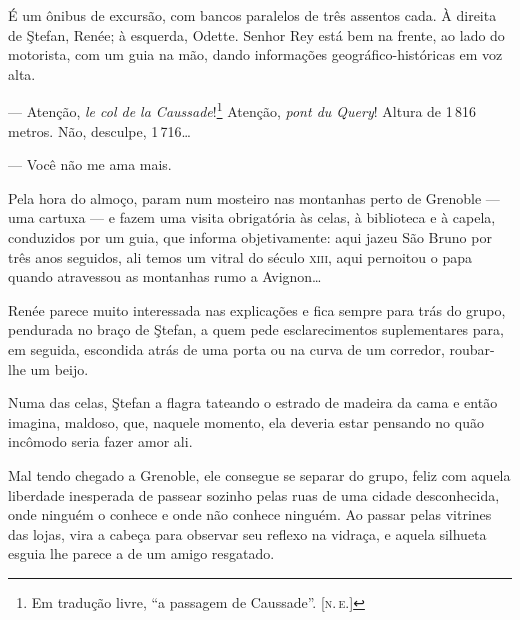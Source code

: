 É um ônibus de excursão, com bancos paralelos de três assentos cada. À
direita de Ştefan, Renée; à esquerda, Odette. Senhor Rey está bem na
frente, ao lado do motorista, com um guia na mão, dando informações
geográfico-históricas em voz alta.

--- Atenção, \emph{le col de la Caussade}!\footnote{Em tradução livre, ``a passagem de Caussade''. \textsc{{[}n.\,e.{]}}} Atenção, \emph{pont du
Query}! Altura de 1\,816 metros. Não, desculpe, 1\,716\ldots{}


--- Você não me ama mais.


Pela hora do almoço, param num mosteiro nas montanhas perto de Grenoble
--- uma cartuxa --- e fazem uma visita obrigatória às celas, à
biblioteca e à capela, conduzidos por um guia, que informa
objetivamente: aqui jazeu São Bruno por três anos seguidos, ali temos um
vitral do século \textsc{xiii}, aqui pernoitou o papa quando atravessou as
montanhas rumo a Avignon\ldots{}

Renée parece muito interessada nas explicações e fica sempre para trás
do grupo, pendurada no braço de Ştefan, a quem pede esclarecimentos
suplementares para, em seguida, escondida atrás de uma porta ou na curva
de um corredor, roubar-lhe um beijo.

Numa das celas, Ştefan a flagra tateando o estrado de madeira da cama e
então imagina, maldoso, que, naquele momento, ela deveria estar pensando
no quão incômodo seria fazer amor ali.

Mal tendo chegado a Grenoble, ele consegue se separar do grupo, feliz
com aquela liberdade inesperada de passear sozinho pelas ruas de uma
cidade desconhecida, onde ninguém o conhece e onde não conhece ninguém.
Ao passar pelas vitrines das lojas, vira a cabeça para observar seu
reflexo na vidraça, e aquela silhueta esguia lhe parece a de um amigo
resgatado.

